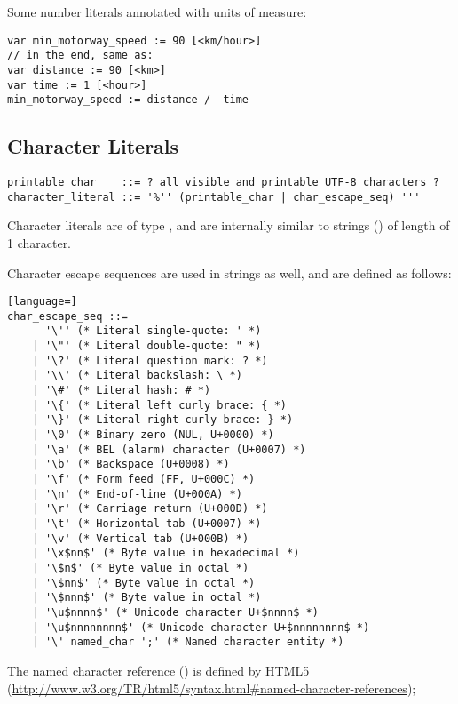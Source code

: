 \example Some number literals annotated with units of measure:
\begin{lstlisting}
var min_motorway_speed := 90 [<km/hour>]
// in the end, same as:
var distance := 90 [<km>]
var time := 1 [<hour>]
min_motorway_speed := distance /- time
\end{lstlisting}






\subsection{Character Literals}
\label{sec:characterliterals}

\syntax\begin{lstlisting}
printable_char    ::= ? all visible and printable UTF-8 characters ? 
character_literal ::= '%'' (printable_char | char_escape_seq) '''
\end{lstlisting}

Character literals are of type , and are internally similar to strings () of length of 1 character. 

Character escape sequences are used in strings as well, and are defined as follows: 

\syntax\begin{lstlisting}[language=]
char_escape_seq ::= 
      '\'' (* Literal single-quote: ' *)
    | '\"' (* Literal double-quote: " *)
    | '\?' (* Literal question mark: ? *)
    | '\\' (* Literal backslash: \ *)
    | '\#' (* Literal hash: # *)
    | '\{' (* Literal left curly brace: { *)
    | '\}' (* Literal right curly brace: } *)
    | '\0' (* Binary zero (NUL, U+0000) *)
    | '\a' (* BEL (alarm) character (U+0007) *)
    | '\b' (* Backspace (U+0008) *)
    | '\f' (* Form feed (FF, U+000C) *)
    | '\n' (* End-of-line (U+000A) *)
    | '\r' (* Carriage return (U+000D) *)
    | '\t' (* Horizontal tab (U+0007) *)
    | '\v' (* Vertical tab (U+000B) *)
    | '\x$nn$' (* Byte value in hexadecimal *) 
    | '\$n$' (* Byte value in octal *)
    | '\$nn$' (* Byte value in octal *)
    | '\$nnn$' (* Byte value in octal *)
    | '\u$nnnn$' (* Unicode character U+$nnnn$ *)
    | '\u$nnnnnnnn$' (* Unicode character U+$nnnnnnnn$ *)
    | '\' named_char ';' (* Named character entity *)
\end{lstlisting}

The named character reference () is defined by HTML5 (\url{http://www.w3.org/TR/html5/syntax.html#named-character-references});






